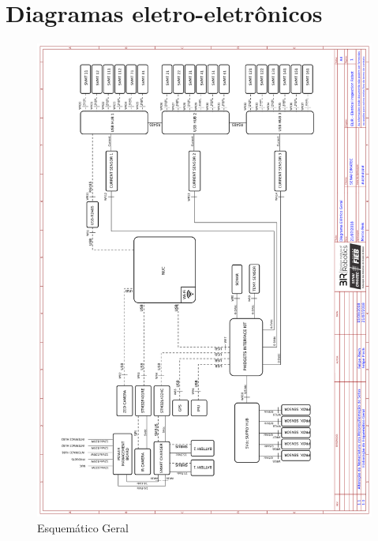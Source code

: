 
\chapter{Diagramas eletro-eletrônicos}
\label{Append:diagele}

\begin{figure}[h]
	\centering
	\includegraphics[width=14cm]{Figures/EsquematicoGeral.png}
	\caption{Esquemático Geral} \label{EGERAL}
	\end{figure}
	
    \pagebreak

